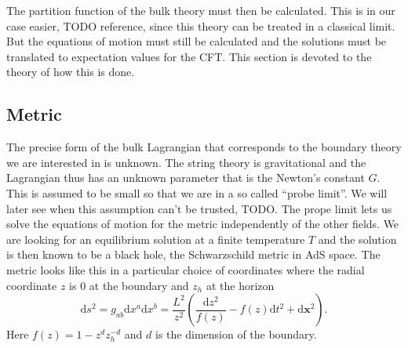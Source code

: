 \documentclass[12pt]{report}
\renewcommand{\d}{\ensuremath{\mathrm{d}}}
\begin{document}
The partition function of the bulk theory must then be calculated. This is in our case easier, TODO reference, since this theory can be treated in a classical limit. But the equations of motion must still be calculated and the solutions must be translated to expectation values for the CFT. This section is devoted to the theory of how this is done.
\subsection{Metric}
The precise form of the bulk Lagrangian that corresponds to the boundary theory we are interested in is unknown. The string theory is gravitational and the Lagrangian thus has an unknown parameter that is the Newton's constant $G$. This is assumed to be small so that we are in a so called ``probe limit''. We will later see when this assumption can't be trusted, TODO. The prope limit lets us solve the equations of motion for the metric independently of the other fields. We are looking for an equilibrium solution at a finite temperature $T$ and the solution is then known to be a black hole, the Schwarzschild metric in AdS space. The metric looks like this in a particular choice of coordinates where the radial coordinate $z$ is 0 at the boundary and $z_h$ at the horizon
\begin{equation}
 \d s^2=g_{ab}\d x^a\d x^b=\frac{L^2}{z^2}\left(\frac{\d z^2}{f(z)}-f(z)\d t^2+\d \mathbf{x}^2\right).
\end{equation}
Here $f(z)=1-z^dz_h^{-d}$ and $d$ is the dimension of the boundary.
\end{document}
